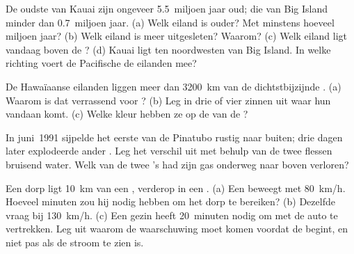 \begin{exercise}[$\star\star$]\label{exo:g7:volcanoes:8}
De oudste  van Kauai zijn ongeveer 5.5~miljoen jaar oud; die van
Big Island minder dan 0.7~miljoen jaar. (a) Welk eiland is ouder? Met
minstens hoeveel miljoen jaar? (b) Welk eiland is meer uitgesleten? Waarom?
(c) Welk eiland ligt vandaag boven de ? (d) Kauai ligt ten
noordwesten van Big Island. In welke richting voert de Pacifische  de
eilanden mee?
\end{exercise}

\begin{exercise}[$\star\star$]\label{exo:g7:volcanoes:9}
De Hawaïaanse eilanden liggen meer dan \qty{3200}{km} van de dichtstbijzijnde
. (a) Waarom is dat verrassend voor ? (b) Leg in drie of
vier zinnen uit waar hun  vandaan komt. (c) Welke kleur hebben ze op de
 van de ?
\end{exercise}

\begin{exercise}[$\star\star$]\label{exo:g7:volcanoes:10}
In juni~1991 sijpelde het eerste  van de Pinatubo rustig naar buiten;
drie dagen later explodeerde ander . Leg het verschil uit met behulp
van de twee flessen bruisend water. Welk van de twee 's had zijn gas
onderweg naar boven verloren?
\end{exercise}

\begin{exercise}[$\star\star\star$]\label{exo:g7:volcanoes:11}
Een dorp ligt \qty{10}{km} van een , verderop in een . (a) Een
 beweegt met \qty{80}{km/h}. Hoeveel minuten zou hij
nodig hebben om het dorp te bereiken? (b) Dezelfde vraag bij
\qty{130}{km/h}. (c) Een gezin heeft 20~minuten nodig om met de auto te
vertrekken. Leg uit waarom de waarschuwing moet komen voordat de
 begint, en niet pas als de stroom te zien is.
\end{exercise}

